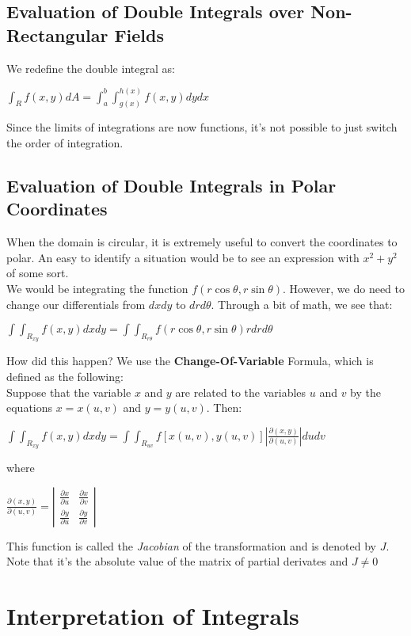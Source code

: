 \documentclass[12pt]{report}
\begin{document}
		\subsection{Evaluation of Double Integrals over Non-Rectangular Fields}
			We redefine the double integral as:\\
			\centerline{$\int_{R}^{}f(x,y)dA = \int_{a}^{b} \int_{g(x)}^{h(x)} f(x,y) dydx$}
			Since the limits of integrations are now functions, it's not possible to just switch the order of integration.
		\subsection{Evaluation of Double Integrals in Polar Coordinates}
			When the domain is circular, it is extremely useful to convert the coordinates to polar. An easy to identify a situation would be to see an expression with $x^2+y^2$ of some sort.\\
			We would be integrating the function $f(r \cos \theta, r \sin \theta)$. However, we do need to change our differentials from $dxdy$ to $drd\theta$. Through a bit of math, we see that:\\
			\centerline{$\int \int_{R_{xy}}^{} f(x,y)dxdy = \int \int_{R_{r\theta}}^{} f(r \cos \theta, r \sin \theta)rdrd\theta$}
			How did this happen? We use the \textbf{Change-Of-Variable} Formula, which is defined as the following:\\
			Suppose that the variable $x$ and $y$ are related to the variables $u$ and $v$ by the equations $x = x(u,v)$ and $y = y(u,v)$. Then:\\
			\centerline{$\int \int_{R_{xy}}^{} f(x,y) dxdy = \int \int_{R_{uv}}^{} f[x(u,v), y(u,v)] | \frac{ \partial (x,y)}{\partial (u,v)} |dudv $}
			where \\
			\centerline{$\frac{\partial (x,y)}{\partial (u,v)} = | \begin{matrix}
				\frac{\partial x}{\partial u} & \frac{\partial x}{\partial v} \\
				\frac{\partial y}{\partial u} & \frac{\partial y}{\partial v}
			\end{matrix}|$}
			This function is called the \textit{Jacobian} of the transformation and is denoted by $J$. Note that it's the absolute value of the matrix of partial derivates and $J\neq 0$
	\section{Interpretation of Integrals}
		
\end{document}
